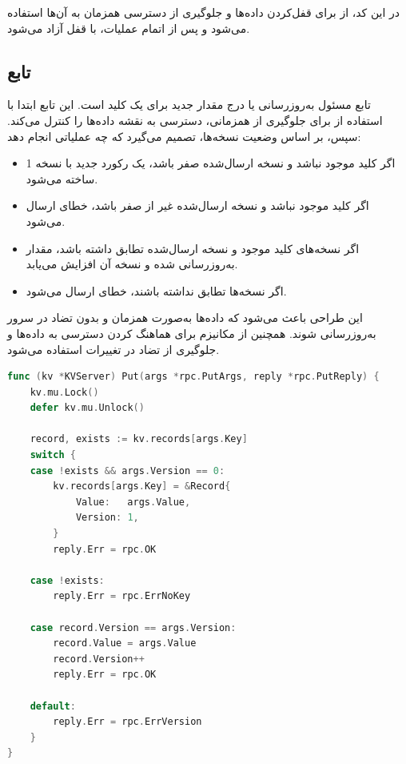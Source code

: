 در این کد، از  برای قفل‌کردن داده‌ها و جلوگیری از دسترسی همزمان به آن‌ها استفاده می‌شود و پس از اتمام عملیات، با  قفل آزاد می‌شود.

\subsection*{تابع }

تابع  مسئول به‌روزرسانی یا درج مقدار جدید برای یک کلید است. این تابع ابتدا با استفاده از  برای جلوگیری از همزمانی، دسترسی به نقشه داده‌ها را کنترل می‌کند. سپس، بر اساس وضعیت نسخه‌ها، تصمیم می‌گیرد که چه عملیاتی انجام دهد:
\begin{itemize}
  \item اگر کلید موجود نباشد و نسخه ارسال‌شده صفر باشد، یک رکورد جدید با نسخه 1 ساخته می‌شود.
  \item اگر کلید موجود نباشد و نسخه ارسال‌شده غیر از صفر باشد، خطای  ارسال می‌شود.
  \item اگر نسخه‌های کلید موجود و نسخه ارسال‌شده تطابق داشته باشد، مقدار به‌روزرسانی شده و نسخه آن افزایش می‌یابد.
  \item اگر نسخه‌ها تطابق نداشته باشند، خطای  ارسال می‌شود.
\end{itemize}

این طراحی باعث می‌شود که داده‌ها به‌صورت همزمان و بدون تضاد در سرور به‌روزرسانی شوند. همچنین از مکانیزم  برای هماهنگ کردن دسترسی به داده‌ها و جلوگیری از تضاد در تغییرات استفاده می‌شود.

\begin{latin}
\begin{lstlisting}[language=Go]
func (kv *KVServer) Put(args *rpc.PutArgs, reply *rpc.PutReply) {
    kv.mu.Lock()
    defer kv.mu.Unlock()

    record, exists := kv.records[args.Key]
    switch {
    case !exists && args.Version == 0:
        kv.records[args.Key] = &Record{
            Value:   args.Value,
            Version: 1,
        }
        reply.Err = rpc.OK

    case !exists:
        reply.Err = rpc.ErrNoKey

    case record.Version == args.Version:
        record.Value = args.Value
        record.Version++
        reply.Err = rpc.OK

    default:
        reply.Err = rpc.ErrVersion
    }
}
\end{lstlisting}
\end{latin}

